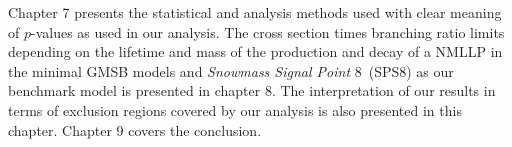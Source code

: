 Chapter 7 presents the statistical and analysis methods used with clear meaning of $p$-values as used in our analysis.
The cross section times branching ratio limits depending on the lifetime and mass of the production and decay of a NMLLP in the minimal GMSB models and \textit{Snowmass Signal Point} 8~(SPS8) as our benchmark model is presented in chapter 8. The interpretation of our results in terms of exclusion regions covered by our analysis is also presented in this chapter. %
Chapter 9 covers the conclusion.







